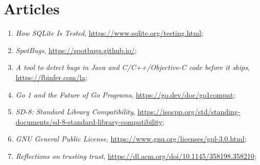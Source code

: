 \documentclass[a4paper,11pt]{article}
\begin{document}
\vspace{2em}














\newpage
\section{Articles}

\vspace{2em}



\begin{enumerate}

\item \textit{How SQLite Is Tested},
  \href{https://www.sqlite.org/testing.html}{https://www.sqlite.org/testing.html};



\item \textit{SpotBugs},
  \href{https://spotbugs.github.io/}{https://spotbugs.github.io/};



\item \textit{A tool to detect bugs in Java and C/C++/Objective-C code
    before it ships},
  \href{https://fbinfer.com/}{https://fbinfer.com/la};



\item \textit{Go 1 and the Future of Go Programs},
  \href{https://go.dev/doc/go1compat}{https://go.dev/doc/go1compat};



\item \textit{SD-8: Standard Library Compatibility},
  \href{https://isocpp.org/std/standing-documents/sd-8-standard-library-compatibility}{https://isocpp.org/std/standing-documents/sd-8-standard-library-compatibility};



\item \textit{GNU General Public License},
  \href{https://www.gnu.org/licenses/gpl-3.0.html}{https://www.gnu.org/licenses/gpl-3.0.html};



\item \textit{Reflections on trusting trust},
  \href{https://dl.acm.org/doi/10.1145/358198.358210}{https://dl.acm.org/doi/10.1145/358198.358210};




\end{enumerate}
\end{document}
